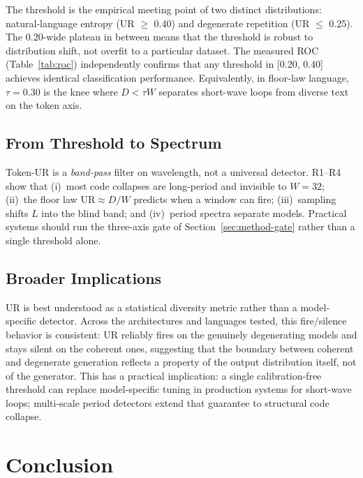 \documentclass[11pt]{article}
\begin{document}
The threshold is the empirical meeting point of two distinct distributions: natural-language entropy (UR $\ge$ 0.40) and degenerate repetition (UR $\le$ 0.25). The 0.20-wide plateau in between means that the threshold is robust to distribution shift, not overfit to a particular dataset. The measured ROC (Table~\ref{tab:roc}) independently confirms that any threshold in [0.20, 0.40] achieves identical classification performance. Equivalently, in floor-law language, $\tau{=}0.30$ is the knee where $D < \tau W$ separates short-wave loops from diverse text on the token axis.

\subsection{From Threshold to Spectrum}

Token-UR is a \emph{band-pass} filter on wavelength, not a universal detector. R1--R4 show that (i)~most code collapses are long-period and invisible to $W{=}32$; (ii)~the floor law $\mathrm{UR}\approx D/W$ predicts when a window can fire; (iii)~sampling shifts $L$ into the blind band; and (iv)~period spectra separate models. Practical systems should run the three-axis gate of Section~\ref{sec:method-gate} rather than a single threshold alone.

\subsection{Broader Implications}

UR is best understood as a statistical diversity metric rather than a model-specific detector. Across the architectures and languages tested, this fire/silence behavior is consistent: UR reliably fires on the genuinely degenerating models and stays silent on the coherent ones, suggesting that the boundary between coherent and degenerate generation reflects a property of the output distribution itself, not of the generator. This has a practical implication: a single calibration-free threshold can replace model-specific tuning in production systems for short-wave loops; multi-scale period detectors extend that guarantee to structural code collapse.


\section{Conclusion}
\end{document}

